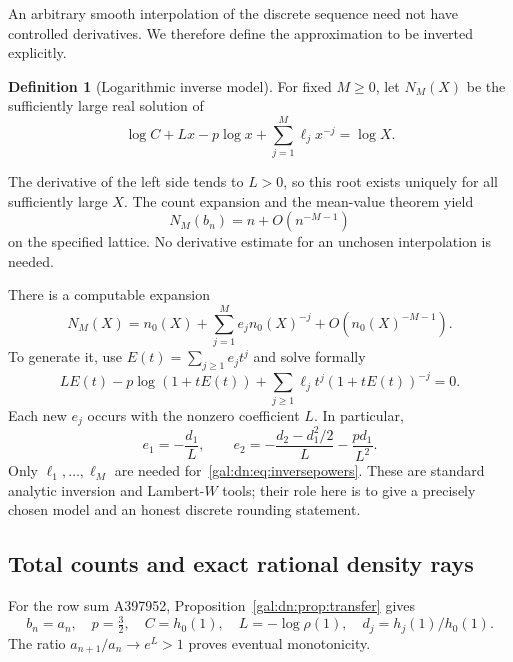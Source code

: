 \documentclass[11pt,letterpaper]{article}
\numberwithin{equation}{section}
\theoremstyle{definition}\newtheorem{definition}[theorem]{Definition}
\theoremstyle{remark}\newtheorem{remark}[theorem]{Remark}
\begin{document}
An arbitrary smooth interpolation of the discrete sequence need not have controlled derivatives. We therefore define the approximation to be inverted explicitly.
\begin{definition}[Logarithmic inverse model]\label{gal:dn:def:inverse}
For fixed $M\geq0$, let $N_M(X)$ be the sufficiently large real solution of
\begin{equation}\label{gal:dn:eq:NM}
 \log C+Lx-p\log x+\sum_{j=1}^M\ell_jx^{-j}=\log X.
\end{equation}
\end{definition}
The derivative of the left side tends to $L>0$, so this root exists uniquely for all sufficiently large $X$. The count expansion and the mean-value theorem yield
\begin{equation}\label{gal:dn:eq:inverseerror}
 N_M(b_n)=n+O(n^{-M-1})
\end{equation}
on the specified lattice. No derivative estimate for an unchosen interpolation is needed.

There is a computable expansion
\begin{equation}\label{gal:dn:eq:inversepowers}
 N_M(X)=n_0(X)+\sum_{j=1}^M e_jn_0(X)^{-j}
                         +O(n_0(X)^{-M-1}).
\end{equation}
To generate it, use $E(t)=\sum_{j\geq1}e_jt^j$ and solve formally
\begin{equation}\label{gal:dn:eq:egen}
 LE(t)-p\log(1+tE(t))
       +\sum_{j\geq1}\ell_jt^j(1+tE(t))^{-j}=0.
\end{equation}
Each new $e_j$ occurs with the nonzero coefficient $L$. In particular,
\begin{equation}\label{gal:dn:eq:e12}
 e_1=-\frac{d_1}L,\qquad
 e_2=-\frac{d_2-d_1^2/2}{L}-\frac{p d_1}{L^2}.
\end{equation}
Only $\ell_1,\ldots,\ell_M$ are needed for~\eqref{gal:dn:eq:inversepowers}. These are standard analytic inversion and Lambert-$W$ tools; their role here is to give a precisely chosen model and an honest discrete rounding statement.

\subsection{Total counts and exact rational density rays}
For the row sum A397952, Proposition~\ref{gal:dn:prop:transfer} gives
\begin{equation}\label{gal:dn:eq:totalinverseparams}
 b_n=a_n,\quad p=\tfrac32,\quad C=h_0(1),\quad
 L=-\log\rho(1),\quad d_j=h_j(1)/h_0(1).
\end{equation}
The ratio $a_{n+1}/a_n\to e^L>1$ proves eventual monotonicity.
\end{document}
